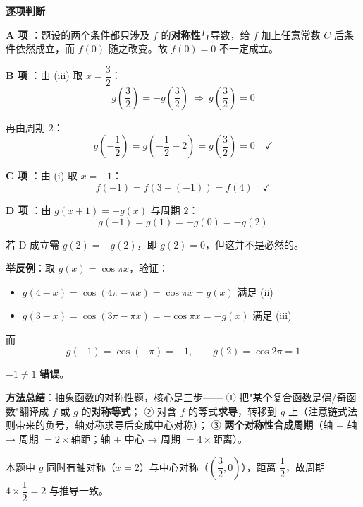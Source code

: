 \begin{answer}
\textbf{逐项判断}

\textbf{A 项 }：题设的两个条件都只涉及 $f$ 的\textbf{对称性}与导数，给 $f$ 加上任意常数 $C$ 后条件依然成立，而 $f(0)$ 随之改变。故 $f(0)=0$ 不一定成立。

\textbf{B 项 }：由 (iii) 取 $x=\dfrac32$：
\nopagebreak[4]
\[g\left(\frac32\right)=-g\left(\frac32\right)\ \Longrightarrow\ g\left(\frac32\right)=0\]

再由周期 $2$：
\nopagebreak[4]
\[g\left(-\frac12\right)=g\left(-\frac12+2\right)=g\left(\frac32\right)=0\quad\checkmark\]

\textbf{C 项 }：由 (i) 取 $x=-1$：
\nopagebreak[4]
\[f(-1)=f\left(3-(-1)\right)=f(4)\quad\checkmark\]

\textbf{D 项 }：由 $g(x+1)=-g(x)$ 与周期 $2$：
\nopagebreak[4]
\[g(-1)=g(1)=-g(0)=-g(2)\]

若 D 成立需 $g(2)=-g(2)$，即 $g(2)=0$，但这并不是必然的。

\textbf{举反例}：取 $g(x)=\cos\pi x$，验证：
\begin{itemize}
\item $g(4-x)=\cos(4\pi-\pi x)=\cos\pi x=g(x)$  满足 (ii)
\item $g(3-x)=\cos(3\pi-\pi x)=-\cos\pi x=-g(x)$  满足 (iii)
\end{itemize}

而
\nopagebreak[4]
\[g(-1)=\cos(-\pi)=-1,\qquad g(2)=\cos2\pi=1\]

$-1\ne1$  \textbf{错误}。

\begin{gktip}
\textbf{方法总结}：抽象函数的对称性题，核心是三步——
① 把"某个复合函数是偶/奇函数"翻译成 $f$ 或 $g$ 的\textbf{对称等式}；
② 对含 $f$ 的等式\textbf{求导}，转移到 $g$ 上（注意链式法则带来的负号，轴对称求导后变成中心对称）；
③ \textbf{两个对称性合成周期}（轴 + 轴 → 周期 $=2\times$轴距；轴 + 中心 → 周期 $=4\times$距离）。

本题中 $g$ 同时有轴对称（$x=2$）与中心对称（$\left(\dfrac32,0\right)$），距离 $\dfrac12$，故周期 $4\times\dfrac12=2$  与推导一致。
\end{gktip}


\par\medskip

\end{answer}

